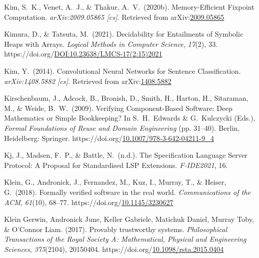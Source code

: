 \documentclass[12pt,twoside]{article}
\begin{document}
{\begin{thebibliography}{1079}
\mdbibitemlabel{}Kim, S.~K., Venet, A.~J., \& Thakur, A.~V.~(2020b). Memory-Efficient Fixpoint Computation. \emph{arXiv:2009.05865 {}[cs]}. Retrieved from arXiv:\href{http://arxiv.org/abs/2009.05865}{2009.05865}%

\mdbibitemlabel{}Kimura, D., \& Tatsuta, M.~(2021). Decidability for Entailments of Symbolic Heaps with Arrays. \emph{Logical Methods in Computer Science}, \emph{17}(2), 33. https://doi.org/\href{https://dx.doi.org/DOI:10.23638/LMCS-17\%25282:15\%25292021}{DOI:10.23638/LMCS-17(2:15)2021}%

\mdbibitemlabel{}Kim, Y.~(2014). Convolutional Neural Networks for Sentence Classification. \emph{arXiv:1408.5882 {}[cs]}. Retrieved from arXiv:\href{http://arxiv.org/abs/1408.5882}{1408.5882}%

\mdbibitemlabel{}Kirschenbaum, J., Adcock, B., Bronish, D., Smith, H., Harton, H., Sitaraman, M., \& Weide, B.~W.~(2009). Verifying Component-Based Software: Deep Mathematics or Simple Bookkeeping? In S.~H.~Edwards \& G.~Kulczycki (Eds.), \emph{Formal Foundations of Reuse and Domain Engineering} (pp. 31–40). Berlin, Heidelberg: Springer. https://doi.org/\href{https://dx.doi.org/10.1007/978-3-642-04211-9_4}{10.1007/978-3-642-04211-9\_4}%

\mdbibitemlabel{}Kj, J., Madsen, F.~P., \& Battle, N.~(n.d.). The Speciﬁcation Language Server Protocol: A Proposal for Standardised LSP Extensions. \emph{F-IDE2021}, 16.%

\mdbibitemlabel{}Klein, G., Andronick, J., Fernandez, M., Kuz, I., Murray, T., \& Heiser, G.~(2018). Formally verified software in the real world. \emph{Communications of the ACM}, \emph{61}(10), 68–77. https://doi.org/\href{https://dx.doi.org/10.1145/3230627}{10.1145/3230627}%

\mdbibitemlabel{}Klein Gerwin, Andronick June, Keller Gabriele, Matichuk Daniel, Murray Toby, \& O’Connor Liam. (2017). Provably trustworthy systems. \emph{Philosophical Transactions of the Royal Society A: Mathematical, Physical and Engineering Sciences}, \emph{375}(2104), 20150404. https://doi.org/\href{https://dx.doi.org/10.1098/rsta.2015.0404}{10.1098/rsta.2015.0404}%


\end{thebibliography}}
\end{document}
